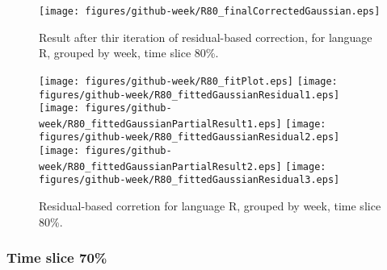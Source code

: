 \begin{figure}[]
\centering
{\texttt{[image: figures/github-week/R80\_finalCorrectedGaussian.eps]}}
\caption{Result after thir iteration of residual-based correction, for language R, grouped by week, time slice 80\%.}
\end{figure}


\begin{figure}[hb]
\centering
{}
{\texttt{[image: figures/github-week/R80\_fitPlot.eps]}}
{\texttt{[image: figures/github-week/R80\_fittedGaussianResidual1.eps]}}
{\texttt{[image: figures/github-week/R80\_fittedGaussianPartialResult1.eps]}}
{\texttt{[image: figures/github-week/R80\_fittedGaussianResidual2.eps]}}
{\texttt{[image: figures/github-week/R80\_fittedGaussianPartialResult2.eps]}}
{\texttt{[image: figures/github-week/R80\_fittedGaussianResidual3.eps]}}
\caption{Residual-based corretion for language R, grouped by week, time slice 80\%.}
\end{figure}


\clearpage 
\newpage 


\FloatBarrier

\subsubsection{Time slice 70\%}

